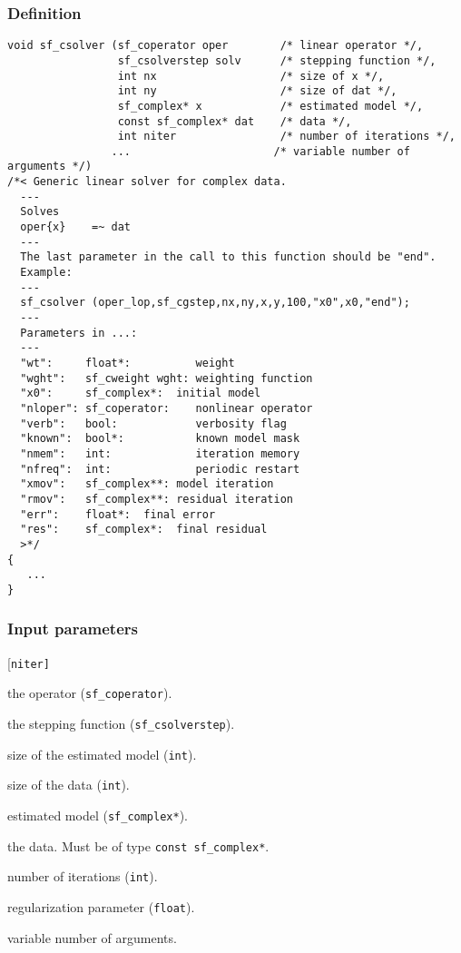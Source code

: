 \subsubsection*{Definition}
\begin{verbatim}
void sf_csolver (sf_coperator oper        /* linear operator */, 
                 sf_csolverstep solv      /* stepping function */, 
                 int nx                   /* size of x */, 
                 int ny                   /* size of dat */, 
                 sf_complex* x            /* estimated model */, 
                 const sf_complex* dat    /* data */, 
                 int niter                /* number of iterations */, 
                ...                      /* variable number of arguments */) 
/*< Generic linear solver for complex data.
  ---
  Solves
  oper{x}    =~ dat
  ---
  The last parameter in the call to this function should be "end".
  Example: 
  ---
  sf_csolver (oper_lop,sf_cgstep,nx,ny,x,y,100,"x0",x0,"end");
  ---
  Parameters in ...:
  ---
  "wt":     float*:          weight      
  "wght":   sf_cweight wght: weighting function
  "x0":     sf_complex*:  initial model
  "nloper": sf_coperator:    nonlinear operator  
  "verb":   bool:            verbosity flag
  "known":  bool*:           known model mask
  "nmem":   int:             iteration memory
  "nfreq":  int:             periodic restart
  "xmov":   sf_complex**: model iteration
  "rmov":   sf_complex**: residual iteration
  "err":    float*:  final error
  "res":    sf_complex*:  final residual
  >*/ 
{
   ...
}
\end{verbatim}

\subsubsection*{Input parameters}
\begin{desclist}{\tt }{\quad}[\tt niter]
   \setlength\itemsep{0pt}
   \item[oper]  the operator (\texttt{sf\_coperator}).  
   \item[solv]  the stepping function (\texttt{sf\_csolverstep}).  
   \item[nx]    size of the estimated model  (\texttt{int}).  
   \item[ny]    size of the data  (\texttt{int}).  
   \item[x]     estimated model  (\texttt{sf\_complex*}).  
   \item[dat]   the data. Must be of type \texttt{const sf\_complex*}.  
   \item[niter] number of iterations (\texttt{int}).  
   \item[eps]   regularization parameter (\texttt{float}).  
   \item[... ]   variable number of arguments.
\end{desclist}

